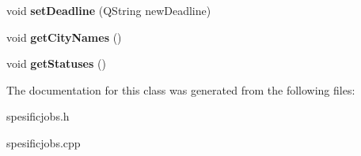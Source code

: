 \begin{DoxyCompactItemize}
\item 
\mbox{\label{class_spesific_jobs_a80ceb9ead40dc83e0adcf6ed2b3d5465}} 
void {\bfseries set\+Deadline} (Q\+String new\+Deadline)
\item 
\mbox{\label{class_spesific_jobs_acbf1efeeb4000a0a1238897daa74085b}} 
void {\bfseries get\+City\+Names} ()
\item 
\mbox{\label{class_spesific_jobs_ad1eead4bdf63388b3cbe0bb79b4b0d09}} 
void {\bfseries get\+Statuses} ()
\end{DoxyCompactItemize}


The documentation for this class was generated from the following files\+:\begin{DoxyCompactItemize}
\item 
spesificjobs.\+h\item 
spesificjobs.\+cpp\end{DoxyCompactItemize}
